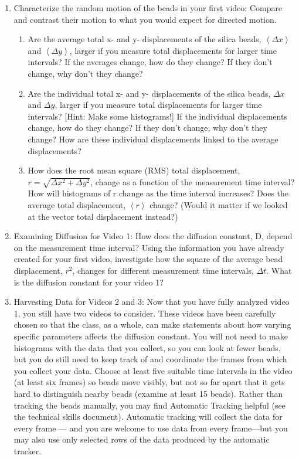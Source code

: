 \begin{enumerate}
\item Characterize the random motion of the beads in your first video: Compare and contrast their motion to what you would expect for directed motion.
\begin{enumerate}
\item Are the average total x- and y- displacements of the silica beads, $\left\langle \Delta x \right\rangle $ and $\left\langle \Delta y \right\rangle $, larger if
you measure total displacements for larger time intervals? If the averages change, how do
they change? If they don't change, why don't they change?
\item Are the individual total x- and y- displacements of the silica beads, $\Delta x$ and $\Delta y$, larger if you
measure total displacements for larger time intervals? [Hint: Make some histograms!] If the individual displacements change, how do they change? If they don't change, why don't they change? How are these individual displacements linked to the average displacements?
\item How does the root mean square (RMS) total displacement, $r = \sqrt{\Delta x^{2}+\Delta y^{2}}$, change as a function of the measurement time interval? How will histograms of r change as the time interval increases? Does the average total displacement, $\left\langle  r \right\rangle $ change? (Would it matter if we looked at the vector total displacement instead?)
\end{enumerate}
\item Examining Diffusion for Video 1: How does the diffusion constant, D, depend on the measurement time interval? Using the information you have already created for your first video, investigate how the square of the average bead displacement, $r^{2}$, changes for different measurement time intervals, $\Delta t$. What is the diffusion constant for your video 1?
\item Harvesting Data for Videos 2 and 3: Now that you have fully analyzed video 1, you still have two videos to consider. These videos have been carefully chosen so that the class, as a whole, can make statements about how varying specific parameters affects the diffusion constant. You will not need to make histograms with the data that you collect, so you can look at fewer beads, but you do still need to keep track of and coordinate the frames from which you collect your data. Choose at least five suitable time intervals in the video (at least six frames) so beads move visibly, but not so far apart that it gets hard to distinguish nearby beads (examine at least 15 beads). Rather than tracking the beads manually, you may find Automatic Tracking helpful (see the technical skills document). Automatic tracking will collect the data for every frame — and you are welcome to use data from every frame—but you may also use only selected rows of the data produced by the automatic tracker.

\end{enumerate}
